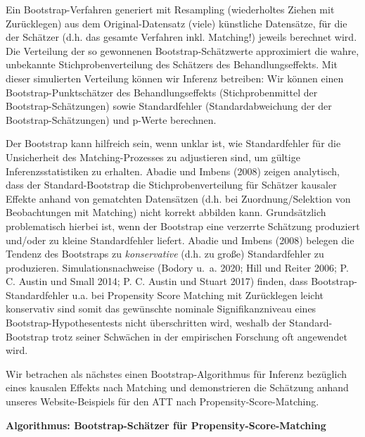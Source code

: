 \documentclass[
  a4paper,
  DIV=11,
  oneside]{scrreprt}
\begin{document}
Ein Bootstrap-Verfahren generiert mit Resampling (wiederholtes Ziehen
mit Zurücklegen) aus dem Original-Datensatz (viele) künstliche
Datensätze, für die der Schätzer (d.h. das gesamte Verfahren inkl.
Matching!) jeweils berechnet wird. Die Verteilung der so gewonnenen
Bootstrap-Schätzwerte approximiert die wahre, unbekannte
Stichprobenverteilung des Schätzers des Behandlungseffekts. Mit dieser
simulierten Verteilung können wir Inferenz betreiben: Wir können einen
Bootstrap-Punktschätzer des Behandlungseffekts (Stichprobenmittel der
Bootstrap-Schätzungen) sowie Standardfehler (Standardabweichung der der
Bootstrap-Schätzungen) und p-Werte berechnen.

Der Bootstrap kann hilfreich sein, wenn unklar ist, wie Standardfehler
für die Unsicherheit des Matching-Prozesses zu adjustieren sind, um
gültige Inferenzsstatistiken zu erhalten. Abadie und Imbens (2008)
zeigen analytisch, dass der Standard-Bootstrap die Stichprobenverteilung
für Schätzer kausaler Effekte anhand von gematchten Datensätzen (d.h.
bei Zuordnung/Selektion von Beobachtungen mit Matching) nicht korrekt
abbilden kann. Grundsätzlich problematisch hierbei ist, wenn der
Bootstrap eine verzerrte Schätzung produziert und/oder zu kleine
Standardfehler liefert. Abadie und Imbens (2008) belegen die Tendenz des
Bootstraps zu \emph{konservative} (d.h. zu große) Standardfehler zu
produzieren. Simulationsnachweise (Bodory u.~a. 2020; Hill und Reiter
2006; P. C. Austin und Small 2014; P. C. Austin und Stuart 2017) finden,
dass Bootstrap-Standardfehler u.a. bei Propensity Score Matching mit
Zurücklegen leicht konservativ sind somit das gewünschte nominale
Signifikanzniveau eines Bootstrap-Hypothesentests nicht überschritten
wird, weshalb der Standard-Bootstrap trotz seiner Schwächen in der
empirischen Forschung oft angewendet wird.

Wir betrachen als nächstes einen Bootstrap-Algorithmus für Inferenz
bezüglich eines kausalen Effekts nach Matching und demonstrieren die
Schätzung anhand unseres Website-Beispiels für den ATT nach
Propensity-Score-Matching.

\textbf{Algorithmus: Bootstrap-Schätzer für Propensity-Score-Matching}
\end{document}

